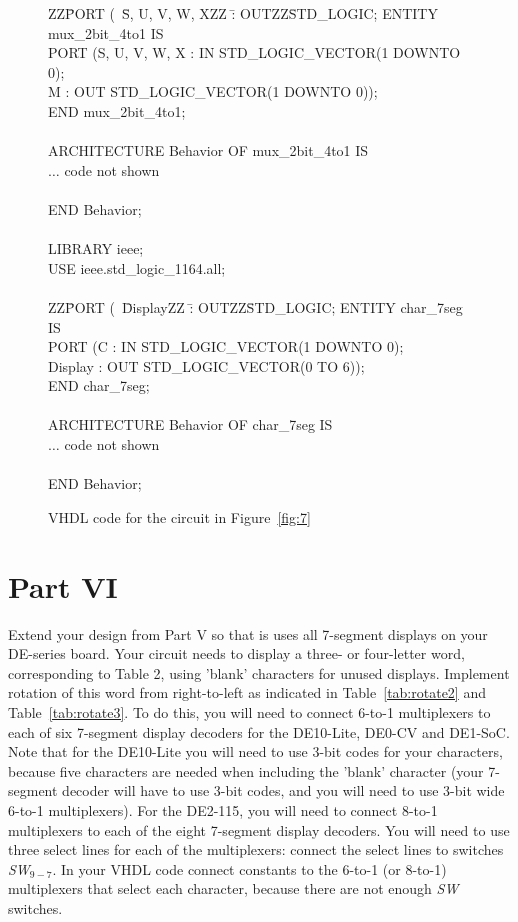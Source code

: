 \documentclass[epsfig,10pt,fullpage]{article}
\begin{document}
\begin{figure}[h!]
\begin{center}
\begin{minipage}[t]{12.5 cm}
\begin{tabbing}
ZZ\=PORT (~\=S, U, V, W, XZZ \=: OUTZZ\=STD\_LOGIC;\kill
ENTITY mux\_2bit\_4to1 IS\\
\>PORT (\>S, U, V, W, X	\>: IN \>STD\_LOGIC\_VECTOR(1 DOWNTO 0);\\
\>\>M	\>: OUT \>STD\_LOGIC\_VECTOR(1 DOWNTO 0));\\
END mux\_2bit\_4to1;\\
~\\
ARCHITECTURE Behavior OF mux\_2bit\_4to1 IS\\
\>$\ldots$ code not shown\\
~\\
END Behavior;\\
~\\
LIBRARY ieee;\\
USE ieee.std\_logic\_1164.all;\\
~\\
ZZ\=PORT (~\=DisplayZZ \=: OUTZZ\=STD\_LOGIC;\kill
ENTITY char\_7seg IS\\
\>PORT (\>C \>: IN \>STD\_LOGIC\_VECTOR(1 DOWNTO 0);\\
\>\>Display	\>: OUT \>STD\_LOGIC\_VECTOR(0 TO 6));\\
END char\_7seg;\\
~\\
ARCHITECTURE Behavior OF char\_7seg IS\\
\>$\ldots$ code not shown\\
~\\
END Behavior;
\end{tabbing}
\end{minipage}
	\caption{VHDL code for the circuit in Figure~\ref{fig:7}}
	\label{fig:8}
\end{center}
\end{figure}

\clearpage
\section*{Part VI}
Extend your design from Part V so that is uses all 7-segment displays on your DE-series board.
Your circuit needs to display a three- or four-letter word, corresponding to Table 2,
using 'blank' characters for unused displays. Implement rotation of this word from right-to-left 
as indicated in Table~\ref{tab:rotate2} and Table~\ref{tab:rotate3}.
To do this, you will need to connect 6-to-1 multiplexers to each of six 7-segment display 
decoders for the DE10-Lite, DE0-CV and DE1-SoC. Note that for the DE10-Lite you will need
to use 3-bit codes for your characters, because five characters are needed when including
the 'blank' character (your 7-segment decoder will have to use 3-bit codes, and you will
need to use 3-bit wide 6-to-1 multiplexers).  For the DE2-115, you will need to connect 
8-to-1 multiplexers to each of the eight 7-segment display decoders. 
You will need to use three select lines for each of the multiplexers: connect the select lines 
to switches {\it SW}$_{9-7}$. In your VHDL code connect constants to the 6-to-1 (or
8-to-1) multiplexers that select each character, because there are not enough {\it SW} switches.
\end{document}
